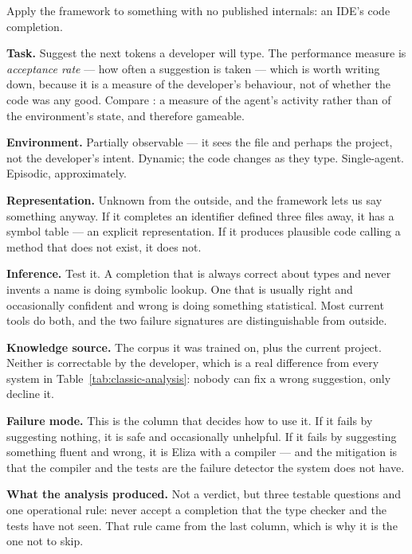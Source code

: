 \begin{worked}
Apply the framework to something with no published internals: an IDE's code
completion.

\smallskip
\textbf{Task.} Suggest the next tokens a developer will type. The performance
measure is \emph{acceptance rate} --- how often a suggestion is taken --- which is
worth writing down, because it is a measure of the developer's behaviour, not of
whether the code was any good. Compare : a measure of the agent's
activity rather than of the environment's state, and therefore gameable.

\smallskip
\textbf{Environment.} Partially observable --- it sees the file and perhaps the
project, not the developer's intent. Dynamic; the code changes as they type.
Single-agent. Episodic, approximately.

\smallskip
\textbf{Representation.} Unknown from the outside, and the framework lets us say
something anyway. If it completes an identifier defined three files away, it has a
symbol table --- an explicit representation. If it produces plausible code calling a
method that does not exist, it does not.

\smallskip
\textbf{Inference.} Test it. A completion that is always correct about types and
never invents a name is doing symbolic lookup. One that is usually right and
occasionally confident and wrong is doing something statistical. Most current tools
do both, and the two failure signatures are distinguishable from outside.

\smallskip
\textbf{Knowledge source.} The corpus it was trained on, plus the current project.
Neither is correctable by the developer, which is a real difference from every
system in Table~\ref{tab:classic-analysis}: nobody can fix a wrong suggestion, only
decline it.

\smallskip
\textbf{Failure mode.} This is the column that decides how to use it. If it fails by
suggesting nothing, it is safe and occasionally unhelpful. If it fails by suggesting
something fluent and wrong, it is Eliza with a compiler --- and the mitigation is
that the compiler and the tests are the failure detector the system does not have.

\smallskip
\textbf{What the analysis produced.} Not a verdict, but three testable questions and
one operational rule: never accept a completion that the type checker and the tests
have not seen. That rule came from the last column, which is why it is the one not
to skip.
\end{worked}

